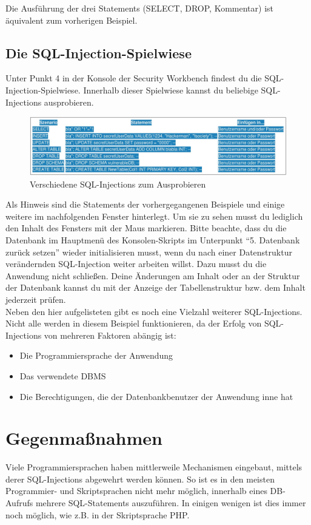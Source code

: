 Die Ausführung der drei Statements (SELECT, DROP, Kommentar) ist äquivalent zum vorherigen Beispiel.

\subsection{Die SQL-Injection-Spielwiese}
Unter Punkt 4 in der Konsole der Security Workbench findest du die SQL-Injection-Spielwiese. Innerhalb dieser Spielwiese kannst du beliebige SQL-Injections ausprobieren.

\begin{figure}[H]
	\centering
	\includegraphics[width=\textwidth]{images/SQL_Injection/various_injections.jpg}
	\caption{Verschiedene SQL-Injections zum Ausprobieren}
	\label{fig:various_injections}
\end{figure}

Als Hinweis sind die Statements der vorhergegangenen Beispiele und einige weitere im nachfolgenden Fenster hinterlegt. Um sie zu sehen musst du lediglich den Inhalt des Fensters mit der Maus markieren. Bitte beachte, dass du die Datenbank im Hauptmenü des Konsolen-Skripts im Unterpunkt \enquote{5. Datenbank zurück setzen} wieder initialisieren musst, wenn du nach einer Datenstruktur verändernden SQL-Injection weiter arbeiten willst. Dazu musst du die Anwendung nicht schließen. Deine Änderungen am Inhalt oder an der Struktur der Datenbank kannst du mit der Anzeige der Tabellenstruktur bzw. dem Inhalt jederzeit prüfen.\\

Neben den hier aufgelisteten gibt es noch eine Vielzahl weiterer SQL-Injections. Nicht alle werden in diesem Beispiel funktionieren, da der Erfolg von SQL-Injections von mehreren Faktoren abängig ist:
\begin{itemize}
	\item Die Programmiersprache der Anwendung
	\item Das verwendete DBMS
	\item Die Berechtigungen, die der Datenbankbenutzer der Anwendung inne hat
\end{itemize}

\section{Gegenmaßnahmen}
Viele Programmiersprachen haben mittlerweile Mechanismen eingebaut, mittels derer SQL-Injections abgewehrt werden können. So ist es in den meisten Programmier- und Skriptsprachen nicht mehr möglich, innerhalb eines DB-Aufrufs mehrere SQL-Statements auszuführen. In einigen wenigen ist dies immer noch möglich, wie z.B. in der Skriptsprache PHP.
